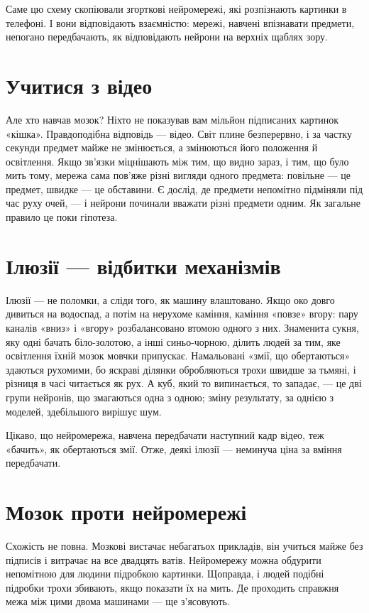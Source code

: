 Саме цю схему скопіювали згорткові нейромережі, які розпізнають картинки в телефоні. І вони відповідають взаємністю: мережі, навчені впізнавати предмети, непогано передбачають, як відповідають нейрони на верхніх щаблях зору.

\section*{Учитися з відео}

Але хто навчав мозок? Ніхто не показував вам мільйон підписаних картинок «кішка». Правдоподібна відповідь --- відео. Світ плине безперервно, і за частку секунди предмет майже не змінюється, а змінюються його положення й освітлення. Якщо зв'язки міцнішають між тим, що видно зараз, і тим, що було мить тому, мережа сама пов'яже різні вигляди одного предмета: повільне --- це предмет, швидке --- це обставини. Є дослід, де предмети непомітно підміняли під час руху очей, --- і нейрони починали вважати різні предмети одним. Як загальне правило це поки гіпотеза.

\section*{Ілюзії --- відбитки механізмів}

Ілюзії --- не поломки, а сліди того, як машину влаштовано. Якщо око довго дивиться на водоспад, а потім на нерухоме каміння, каміння «повзе» вгору: пару каналів «вниз» і «вгору» розбалансовано втомою одного з них. Знаменита сукня, яку одні бачать біло-золотою, а інші синьо-чорною, ділить людей за тим, яке освітлення їхній мозок мовчки припускає. Намальовані «змії, що обертаються» здаються рухомими, бо яскраві ділянки обробляються трохи швидше за тьмяні, і різниця в часі читається як рух. А куб, який то випинається, то западає, --- це дві групи нейронів, що змагаються одна з одною; зміну результату, за однією з моделей, здебільшого вирішує шум.

Цікаво, що нейромережа, навчена передбачати наступний кадр відео, теж «бачить», як обертаються змії. Отже, деякі ілюзії --- неминуча ціна за вміння передбачати.

\section*{Мозок проти нейромережі}

Схожість не повна. Мозкові вистачає небагатьох прикладів, він учиться майже без підписів і витрачає на все двадцять ватів. Нейромережу можна обдурити непомітною для людини підробкою картинки. Щоправда, і людей подібні підробки трохи збивають, якщо показати їх на мить. Де проходить справжня межа між цими двома машинами --- ще з'ясовують.

